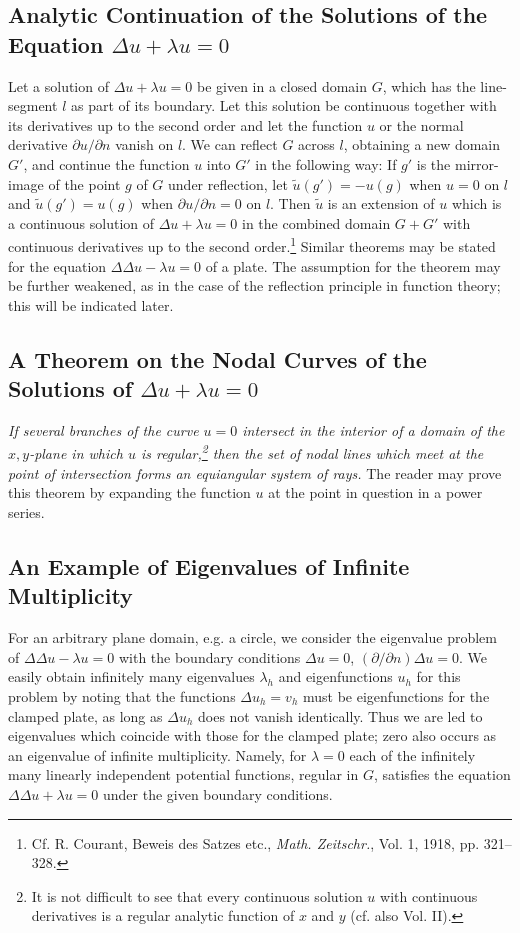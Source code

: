 \subsection{Analytic Continuation of the Solutions of the Equation $\Delta u+\lambda u=0$}
Let a solution of $\Delta u+\lambda u=0$ be given in a closed domain $G$, which has the line-segment $l$ as part of its boundary. Let this solution be continuous together with its derivatives up to the second order and let the function $u$ or the normal derivative $\partial u/\partial n$ vanish on $l$. We can reflect $G$ across $l$, obtaining a new domain $G'$, and continue the function $u$ into $G'$ in the following way: If $g'$ is the mirror-image of the point $g$ of $G$ under reflection, let $\widetilde u(g')=-u(g)$ when $u=0$ on $l$ and $\widetilde u(g')=u(g)$ when $\partial u/\partial n=0$ on $l$. Then $\widetilde u$ is an extension of $u$ which is a continuous solution of $\Delta u+\lambda u=0$ in the combined domain $G+G'$ with continuous derivatives up to the second order.\footnote{Cf. R. Courant, Beweis des Satzes etc., \emph{Math. Zeitschr.}, Vol. 1, 1918, pp. 321--328.} Similar theorems may be stated for the equation $\Delta\Delta u-\lambda u=0$ of a plate. The assumption for the theorem may be further weakened, as in the case of the reflection principle in function theory; this will be indicated later.

\subsection{A Theorem on the Nodal Curves of the Solutions of $\Delta u+\lambda u=0$}
\emph{If several branches of the curve $u=0$ intersect in the interior of a domain of the $x,y$-plane in which $u$ is regular,\footnote{It is not difficult to see that every continuous solution $u$ with continuous derivatives is a regular analytic function of $x$ and $y$ (cf. also Vol. II).} then the set of nodal lines which meet at the point of intersection forms an equiangular system of rays.} The reader may prove this theorem by expanding the function $u$ at the point in question in a power series.

\subsection{An Example of Eigenvalues of Infinite Multiplicity}
For an arbitrary plane domain, e.g. a circle, we consider the eigenvalue problem of $\Delta\Delta u-\lambda u=0$ with the boundary conditions $\Delta u=0$, $(\partial/\partial n)\Delta u=0$. We easily obtain infinitely many eigenvalues $\lambda_h$ and eigenfunctions $u_h$ for this problem by noting that the functions $\Delta u_h=v_h$ must be eigenfunctions for the clamped plate, as long as $\Delta u_h$ does not vanish identically. Thus we are led to eigenvalues which coincide with those for the clamped plate; zero also occurs as an eigenvalue of infinite multiplicity. Namely, for $\lambda=0$ each of the infinitely many linearly independent potential functions, regular in $G$, satisfies the equation $\Delta\Delta u+\lambda u=0$ under the given boundary conditions.

